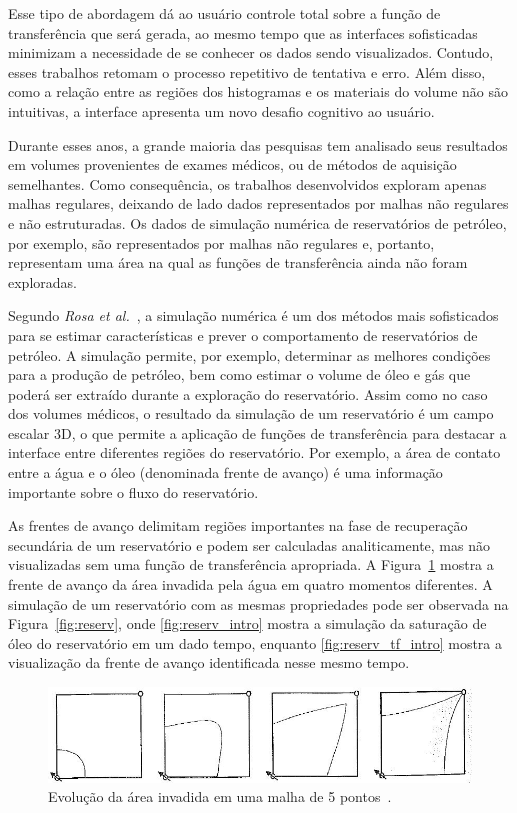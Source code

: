    Esse tipo de abordagem dá ao usuário controle total sobre a função de transferência que será gerada, ao mesmo tempo que as interfaces sofisticadas minimizam a necessidade de se conhecer os dados sendo visualizados. Contudo, esses trabalhos retomam o processo repetitivo de tentativa e erro. Além disso, como a relação entre as regiões dos histogramas e os materiais do volume não são intuitivas, a interface apresenta um novo desafio cognitivo ao usuário.
    
    Durante esses anos, a grande maioria das pesquisas tem analisado seus resultados em volumes provenientes de exames médicos, ou de métodos de aquisição semelhantes. Como consequência, os trabalhos desenvolvidos exploram apenas malhas regulares, deixando de lado dados representados por malhas não regulares e não estruturadas. Os dados de simulação numérica de reservatórios de petróleo, por exemplo, são representados por malhas não regulares e, portanto, representam uma área na qual as funções de transferência ainda não foram exploradas.
    
    Segundo \textit{Rosa et al.}~\cite{rosa}, a simulação numérica é um dos métodos mais sofisticados para se estimar características e prever o comportamento de reservatórios de petróleo. A simulação permite, por exemplo, determinar as melhores condições para a produção de petróleo, bem como estimar o volume de óleo e gás que poderá ser extraído durante a exploração do reservatório. Assim como no caso dos volumes médicos, o resultado da simulação de um reservatório é um campo escalar 3D, o que permite a aplicação de funções de transferência para destacar a interface entre diferentes regiões do reservatório. Por exemplo, a área de contato entre a água e o óleo (denominada frente de avanço) é uma informação importante sobre o fluxo do reservatório.
    
    As frentes de avanço delimitam regiões importantes na fase de recuperação secundária de um reservatório e podem ser calculadas analiticamente, mas não visualizadas sem uma função de transferência apropriada. A Figura~\ref{fig:reserv_livro} mostra a frente de avanço da área invadida pela água em quatro momentos diferentes. A simulação de um reservatório com as mesmas propriedades pode ser observada na Figura~\ref{fig:reserv}, onde \ref{fig:reserv_intro} mostra a simulação da saturação de óleo do reservatório em um dado tempo, enquanto \ref{fig:reserv_tf_intro} mostra a visualização da frente de avanço identificada nesse mesmo tempo.
    
\begin{figure}[h]
   	\centering
   	\includegraphics[width=1\textwidth]{images/reserv_livro}
   	\caption{Evolução da área invadida em uma malha de 5 pontos~\cite{rosa}.}
   	\label{fig:reserv_livro}
\end{figure}
    
